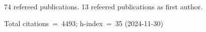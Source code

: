 74 refereed publications. 13 refeered publications as first author.

Total citations~=~4493; h-index~=~35 (2024-11-30)